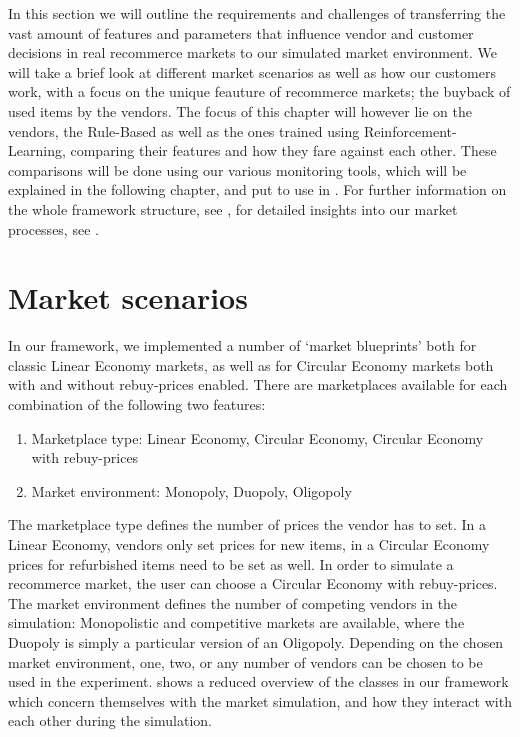 \begin{jointwork}\label{ch:SimulatingMarketplace}
	In this section we will outline the requirements and challenges of transferring the vast amount of features and parameters that influence vendor and customer decisions in real recommerce markets to our simulated market environment. We will take a brief look at different market scenarios as well as how our customers work, with a focus on the unique feauture of recommerce markets; the buyback of used items by the vendors. The focus of this chapter will however lie on the vendors, the Rule-Based as well as the ones trained using Reinforcement-Learning, comparing their features and how they fare against each other. These comparisons will be done using our various monitoring tools, which will be explained in the following chapter,  and put to use in . For further information on the whole framework structure, see \cite{LeoThesis}, for detailed insights into our market processes, see \cite{NickThesis}.
\end{jointwork}

\section{Market scenarios}\label{sec:MarketScenarios}

In our framework, we implemented a number of `market blueprints' both for classic Linear Economy markets, as well as for Circular Economy markets both with and without rebuy-prices enabled. There are marketplaces available for each combination of the following two features:
\begin{enumerate}
	\item Marketplace type: Linear Economy, Circular Economy, Circular Economy with rebuy-prices
	\item Market environment: Monopoly, Duopoly, Oligopoly
\end{enumerate}
The marketplace type defines the number of prices the vendor has to set. In a Linear Economy, vendors only set prices for new items, in a Circular Economy prices for refurbished items need to be set as well. In order to simulate a recommerce market, the user can choose a Circular Economy with rebuy-prices. The market environment defines the number of competing vendors in the simulation: Monopolistic and competitive markets are available, where the Duopoly is simply a particular version of an Oligopoly. Depending on the chosen market environment, one, two, or any number of vendors can be chosen to be used in the experiment.  shows a reduced overview of the classes in our framework which concern themselves with the market simulation, and how they interact with each other during the simulation.

